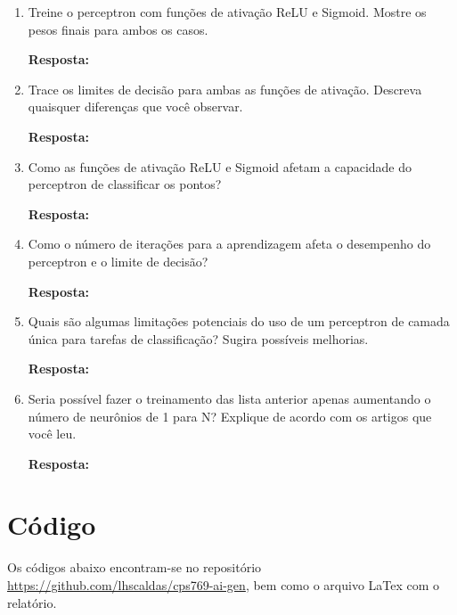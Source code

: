 \documentclass[12 pt]{article}
\begin{document}
\begin{enumerate}
    \item Treine o perceptron com funções de ativação ReLU e Sigmoid. Mostre os pesos finais para ambos os casos.\par

    \textbf{Resposta:} \par
    \item Trace os limites de decisão para ambas as funções de ativação. Descreva quaisquer diferenças que você observar.\par

    \textbf{Resposta:} \par
    \item Como as funções de ativação ReLU e Sigmoid afetam a capacidade do perceptron de classificar os pontos?\par

    \textbf{Resposta:} \par
    \item Como o número de iterações para a aprendizagem afeta o desempenho do perceptron e o limite de decisão?\par

    \textbf{Resposta:} \par
    \item Quais são algumas limitações potenciais do uso de um perceptron de camada única para tarefas de classificação? Sugira possíveis melhorias.\par

    \textbf{Resposta:} \par
    \item Seria possível fazer o treinamento das lista anterior apenas aumentando o número de neurônios de 1 para N? Explique de acordo com os artigos que você leu.\par

    \textbf{Resposta:} \par
\end{enumerate}



\section*{Código}

Os códigos abaixo encontram-se no repositório \href{https://github.com/lhscaldas/cps769-ai-gen}{https://github.com/lhscaldas/cps769-ai-gen}, bem como o arquivo LaTex com o relatório.


% 
\end{document}
